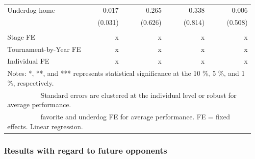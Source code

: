 \documentclass[11pt,a4paper]{article}
\begin{document}
\begin{table}[H]
\begin{tabular}{l r r r r r r r}
			Underdog home            &  0.017       & & -0.265    & & 0.338     & & 0.006    \\
			                         & (0.031)      & & (0.626)   & & (0.814)   & & (0.508)  \\
            \rule{0pt}{0.3ex}\\
            \midrule
			Stage FE  & x  & & x & & x & & x  \\ 
			Tournament-by-Year FE    & x  & & x & & x & & x  \\ 
			Individual FE            & x  & & x & & x & & x  \\ 			 
			\bottomrule
            \bottomrule
			\multicolumn{8}{l}{\footnotesize Notes: *, **, and *** represents statistical significance at the 10 \%, 5 \%, and 1 \%, respectively. }\\
			\multicolumn{8}{l}{\footnotesize ~~~~~~~~~ Standard errors are clustered at the individual level or robust for average performance.}\\
			\multicolumn{8}{l}{\footnotesize ~~~~~~~~~ favorite and underdog FE for average performance. FE = fixed effects. Linear regression.}
		\end{tabular}
	\end{table}

\subsubsection{Results with regard to future opponents}
\end{document}
